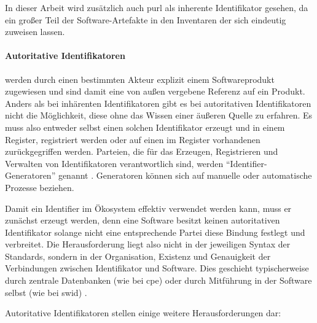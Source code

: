 In dieser Arbeit wird zusätzlich auch \acrshort{purl} als inherente Identifikator gesehen, da ein großer Teil der Software-Artefakte in den Inventaren der \metaeffektsp sich eindeutig  zuweisen lassen.

\paragraph{Autoritative Identifikatoren}\label{par:authorative-identifiers} %
werden durch einen bestimmten Akteur explizit einem Softwareprodukt zugewiesen und sind damit eine von außen vergebene Referenz auf ein Produkt.
Anders als bei inhärenten Identifikatoren gibt es bei autoritativen Identifikatoren nicht die Möglichkeit, diese ohne das Wissen einer äußeren Quelle zu erfahren.
Es muss also entweder selbst einen solchen Identifikator erzeugt und in einem Register, registriert werden oder auf einen im Register vorhandenen zurückgegriffen werden.
Parteien, die für das Erzeugen, Registrieren und Verwalten von Identifikatoren verantwortlich sind, werden \enquote{Identifier-Generatoren} genannt \autocite{CISA2023}.
Generatoren können sich auf manuelle oder automatische Prozesse beziehen.

Damit ein Identifier im Ökosystem effektiv verwendet werden kann, muss er zunächst erzeugt werden, denn eine Software besitzt keinen autoritativen Identifikator solange nicht eine entsprechende Partei diese Bindung festlegt und verbreitet.
Die Herausforderung liegt also nicht in der jeweiligen Syntax der Standards, sondern in der Organisation, Existenz und Genauigkeit der Verbindungen zwischen Identifikator und Software.
Dies geschieht typischerweise durch zentrale Datenbanken (wie bei \acrshort{cpe}) oder durch Mitführung in der Software selbst (wie bei \acrfull{swid}) \autocite{CISA2023}.

Autoritative Identifikatoren stellen einige weitere Herausforderungen dar:

